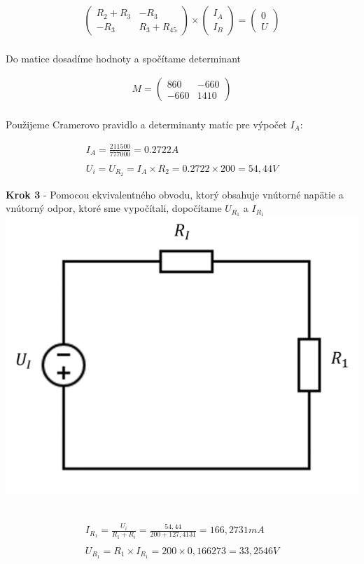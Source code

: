 \begin{gather*}
    \begin{pmatrix}
    R_2 + R_3 & -R_3 \\
    -R_3 & R_3 + R_{45}
    \end{pmatrix}
    \times
    \begin{pmatrix}
    I_A \\
    I_B
    \end{pmatrix}
    =
    \begin{pmatrix}
    0 \\
    U
    \end{pmatrix}
\end{gather*}
\\

Do matice dosadíme hodnoty a spočítame determinant

\begin{gather*}
    M =
    \begin{pmatrix}
    860 & -660 \\
    -660 & 1410
    \end{pmatrix}
\end{gather*}
\\

Použijeme Cramerovo pravidlo a determinanty matíc pre výpočet $I_A$:

\begin{gather*}
    I_A = \frac{211500}{777000} = 0.2722 A
    \\\\
    U_i = U_{R_2} = I_A \times R_2 = 0.2722 \times 200 = 54,44 V
\end{gather*}

\begin{center}
    \textbf{Krok 3} - Pomocou ekvivalentného obvodu, ktorý obsahuje vnútorné napätie a vnútorný odpor, ktoré sme vypočítali, dopočítame $U_{R_1}$ a $I_{R_1}$ \\
    \includegraphics[scale=0.5,keepaspectratio]{fig/pr2_3.png} \
\end{center}

\begin{gather*}
    I_{R_{1}} = \frac {U_{i}} {R_{1} + R_{i}} = \frac {54,44} { 200 + 127,4131} = 166,2731 mA \\\\
    U_{R_{1}} = R_1 \times  I_{R_{1}} = 200 \times 0,166273 = 33,2546 V \\
\end{gather*}

